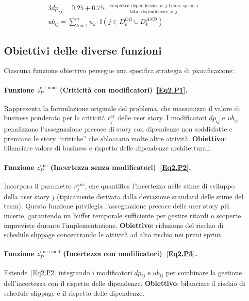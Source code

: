 \documentclass[12pt,a4paper,openright,twoside]{book}
\begin{document}
\begin{alignat}{3}
dp_{ij} = 0.25 + 0.75 \cdot \frac{\text{completed dependencies of } j \text{ before sprint } i}{\text{total dependencies of } j}
    &\label{Eq2.dp}\\
ub_{ij} = \sum_{k=1}^n u_k \cdot \mathbb{I}(j \in D_k^{OR} \cup D_k^{AND}) 
    &\label{Eq2.ub}
\end{alignat}

\subsection{Obiettivi delle diverse funzioni}

Ciascuna funzione obiettivo persegue una specifica strategia di pianificazione:

\paragraph{Funzione \texorpdfstring{$z_P^\text{cr+mod}$}{z\_P\^{}cr} (Criticità con modificatori)~\eqref{Eq2.P1}.} 
Rappresenta la formulazione originale del problema, che massimizza il valore di business ponderato per la criticità $r_j^{cr}$ delle user story. I modificatori $dp_{ij}$ e $ub_{ij}$ penalizzano l'assegnazione precoce di story con dipendenze non soddisfatte e premiano le story ``critiche'' che sbloccano molte altre attività. \textbf{Obiettivo}: bilanciare valore di business e rispetto delle dipendenze architetturali.

\paragraph{Funzione \texorpdfstring{$z_P^\text{unc}$}{z\_P\^{}unc} (Incertezza senza modificatori)~\eqref{Eq2.P2}.}
Incorpora il parametro $r_j^{unc}$, che quantifica l'incertezza nelle stime di sviluppo della user story $j$ (tipicamente derivata dalla deviazione standard delle stime del team). Questa funzione privilegia l'assegnazione precoce delle user story più incerte, garantendo un buffer temporale sufficiente per gestire ritardi o scoperte impreviste durante l'implementazione. \textbf{Obiettivo}: riduzione del rischio di schedule slippage concentrando le attività ad alto rischio nei primi sprint.

\paragraph{Funzione \texorpdfstring{$z_P^\text{unc+mod}$}{z\_P\^{}unc+mod} (Incertezza con modificatori)~\eqref{Eq2.P3}.}
Estende~\eqref{Eq2.P2} integrando i modificatori $dp_{ij}$ e $ub_{ij}$ per combinare la gestione dell'incertezza con il rispetto delle dipendenze. \textbf{Obiettivo}: bilanciare il rischio di schedule slippage e il rispetto delle dipendenze.
\end{document}
